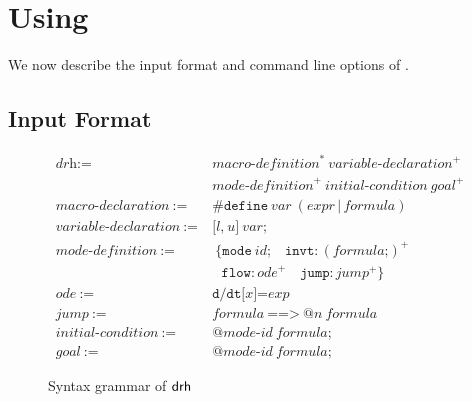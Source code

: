 \section{Using \dReach{}}\label{sec:using-dreach}

We now describe the input format and command line options of \dReach{}.

\subsection{Input Format}\label{sec:input-format}

\begin{figure}
  \begin{framed}
    \begin{align*}
      \textit{drh} := \ & \textit{macro-definition}^* \ \textit{variable-declaration}^+ \\
                        & \textit{mode-definition}^+ \  \textit{initial-condition} \  \textit{goal}^+\\
      \textit{macro-declaration} \ := \ &  \texttt{\#define} \ \textit{var} \ (\textit{expr} \, | \, \textit{formula})\\
      \textit{variable-declaration} \ := \ &  \texttt{[}
                                              \textit{l}
                                              \texttt{,}
                                              \ \textit{u}
                                              \texttt{]}
                                              \ \textit{var}
                                              \texttt{;}\\
      \textit{mode-definition} \ := \ & \ \texttt{\{}
                                         \texttt{mode} \
                                         \textit{id}\texttt{;} \quad
                                         \texttt{invt}:(\textit{formula} \texttt{;})^+\\
                                    & \ \ \ \texttt{flow}:\textit{ode}^+ \quad
                                    \texttt{jump}:\textit{jump}^+ \texttt{\}}\\
      \textit{ode} \ := \ & \texttt{d/dt[}\textit{x}\texttt{]=}\textit{exp}\\
      \textit{jump} \ := \ & \textit{formula} \ \texttt{==>} \ \texttt{@}\textit{n} \ \textit{formula}\\
      \textit{initial-condition} \ := \ & \texttt{@}\textit{mode-id} \ \textit{formula}\texttt{;}\\
      \textit{goal}              \ := \ & \texttt{@}\textit{mode-id} \ \textit{formula}\texttt{;}
    \end{align*}
  \end{framed}
  \caption{Syntax grammar of $\textsf{drh}{}$}\label{fig:drh-grammar}
\end{figure}

